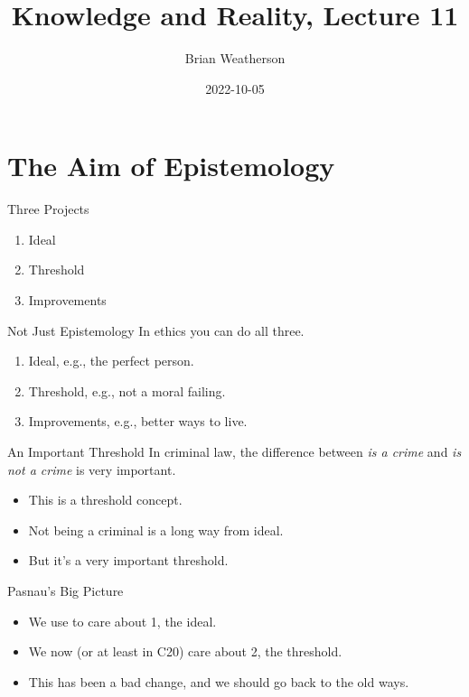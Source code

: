 \documentclass[
  17pt,
  letterpaper,
  ignorenonframetext,
  aspectratio=169,
]{beamer}
\title{Knowledge and Reality, Lecture 11}
\author{Brian Weatherson}
\date{2022-10-05}
\providecommand{\tightlist}{%
  \setlength{\itemsep}{0pt}\setlength{\parskip}{0pt}}\usepackage{longtable,booktabs,array}
\begin{document}
\frame{\titlepage}
\ifdefined\Shaded\renewenvironment{Shaded}{\begin{tcolorbox}[interior hidden, borderline west={3pt}{0pt}{shadecolor}, boxrule=0pt, frame hidden, enhanced, breakable, sharp corners]}{\end{tcolorbox}}\fi

\hypertarget{the-aim-of-epistemology}{%
\section{The Aim of Epistemology}\label{the-aim-of-epistemology}}

\begin{frame}{Three Projects}
\protect\hypertarget{three-projects}{}
\begin{enumerate}[<+->]
\tightlist
\item
  Ideal
\item
  Threshold
\item
  Improvements
\end{enumerate}
\end{frame}

\begin{frame}{Not Just Epistemology}
\protect\hypertarget{not-just-epistemology}{}
In ethics you can do all three.

\begin{enumerate}[<+->]
\tightlist
\item
  Ideal, e.g., the perfect person.
\item
  Threshold, e.g., not a moral failing.
\item
  Improvements, e.g., better ways to live.
\end{enumerate}
\end{frame}

\begin{frame}{An Important Threshold}
\protect\hypertarget{an-important-threshold}{}
In criminal law, the difference between \emph{is a crime} and \emph{is
not a crime} is very important.

\begin{itemize}[<+->]
\tightlist
\item
  This is a threshold concept.
\item
  Not being a criminal is a long way from ideal.
\item
  But it's a very important threshold.
\end{itemize}
\end{frame}

\begin{frame}{Pasnau's Big Picture}
\protect\hypertarget{pasnaus-big-picture}{}
\begin{itemize}[<+->]
\tightlist
\item
  We use to care about 1, the ideal.
\item
  We now (or at least in C20) care about 2, the threshold.
\item
  This has been a bad change, and we should go back to the old ways.
\end{itemize}
\end{frame}
\end{document}
